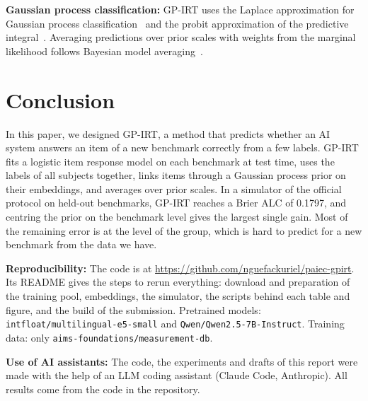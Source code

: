 \documentclass{article}
\begin{document}
\textbf{Gaussian process classification:} GP-IRT uses the Laplace approximation for Gaussian process
classification~\citep{rasmussen2006gaussian} and the probit approximation of the predictive
integral~\citep{mackay1992evidence}. Averaging predictions over prior scales with weights from the marginal likelihood
follows Bayesian model averaging~\citep{hoeting1999bayesian}.

\section{Conclusion}
In this paper, we designed GP-IRT, a method that predicts whether an AI system answers an item of a new benchmark
correctly from a few labels. GP-IRT fits a logistic item response model on each benchmark at test time, uses the labels
of all subjects together, links items through a Gaussian process prior on their embeddings, and averages over prior
scales. In a simulator of the official protocol on held-out benchmarks, GP-IRT reaches a Brier ALC of 0.1797, and
centring the prior on the benchmark level gives the largest single gain. Most of the remaining error is at the level
of the group, which is hard to predict for a new benchmark from the data we have.

\textbf{Reproducibility:} The code is at \url{https://github.com/nguefackuriel/paiec-gpirt}. Its README gives the
steps to rerun everything: download and preparation of the training pool, embeddings, the simulator, the scripts
behind each table and figure, and the build of the submission. Pretrained models:
\texttt{intfloat/multilingual-e5-small} and \texttt{Qwen/Qwen2.5-7B-Instruct}. Training data: only
\texttt{aims-foundations/measurement-db}.

\textbf{Use of AI assistants:} The code, the experiments and drafts of this report were made with the help of an LLM
coding assistant (Claude Code, Anthropic). All results come from the code in the repository.

{\small


}
\end{document}
